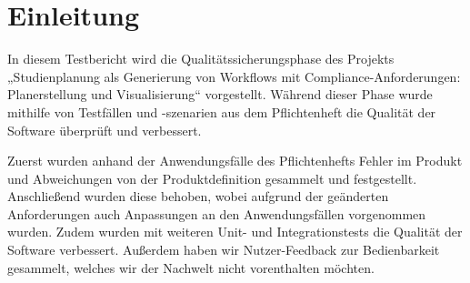 \section{Einleitung}

In diesem Testbericht wird die Qualitätssicherungsphase des Projekts „Studienplanung als Generierung von Workflows mit Compliance-Anforderungen: Planerstellung und Visualisierung“ vorgestellt. Während dieser Phase wurde mithilfe von Testfällen und -szenarien aus dem Pflichtenheft die Qualität der Software überprüft und verbessert.

Zuerst wurden anhand der Anwendungsfälle des Pflichtenhefts Fehler im Produkt und Abweichungen von der Produktdefinition gesammelt und festgestellt. Anschließend wurden diese behoben, wobei aufgrund der geänderten Anforderungen auch Anpassungen an den Anwendungsfällen vorgenommen wurden. Zudem wurden mit weiteren Unit- und Integrationstests die Qualität der Software verbessert. Außerdem haben wir Nutzer-Feedback zur Bedienbarkeit gesammelt, welches wir der Nachwelt nicht vorenthalten möchten.